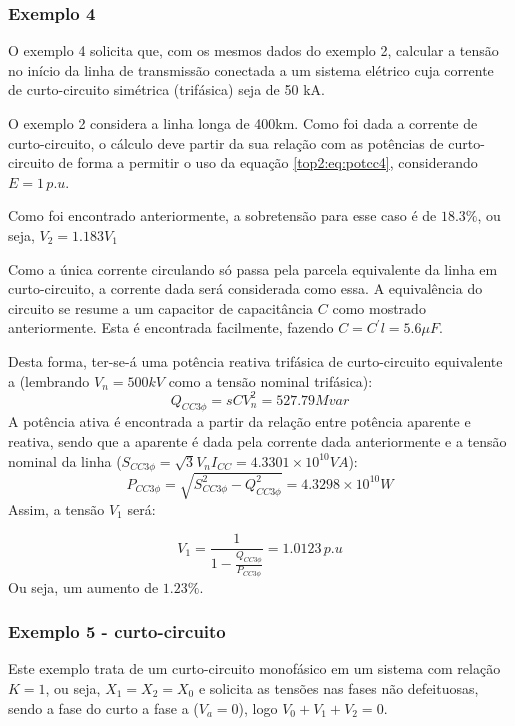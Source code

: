\subsubsection*{Exemplo 4}

O exemplo 4 solicita que, com os mesmos dados do exemplo 2, calcular a tensão no início da linha de transmissão conectada a um sistema elétrico cuja corrente de curto-circuito simétrica (trifásica) seja de 50 kA.

O exemplo 2 considera a linha longa de 400km. Como foi dada a corrente de curto-circuito, o cálculo deve partir da sua relação com as potências de curto-circuito de forma a permitir o uso da equação \ref{top2:eq:potcc4}, considerando $E = 1 \,  p.u$. 

Como foi encontrado anteriormente, a sobretensão para esse caso é de $18.3\%$, ou seja, $V_2 = 1.183 V_1$

Como a única corrente circulando só passa pela parcela equivalente da linha em curto-circuito, a corrente dada será considerada como essa. A equivalência do circuito se resume a um capacitor de capacitância $C$ como mostrado anteriormente. Esta é encontrada facilmente, fazendo $C = C^{'}l = 5.6 \mu F$. 

Desta forma, ter-se-á uma potência reativa trifásica de curto-circuito  equivalente a (lembrando $V_n = 500kV$ como a tensão nominal trifásica):
\begin{equation}
Q_{CC3\phi} = sCV_n^2 = 527.79Mvar
\end{equation}
A potência ativa é encontrada a partir da relação entre potência aparente e reativa, sendo que a aparente é dada pela corrente dada anteriormente e a tensão nominal da linha ($S_{CC3\phi} = \sqrt{3}V_nI_{CC} = 4.3301 \times 10^{10} VA$):
\begin{equation}
P_{CC3\phi} = \sqrt{S_{CC3\phi}^2 - Q_{CC3\phi}^2}  = 4.3298 \times 10^{10} W 
\end{equation}
Assim, a tensão $V_1$ será:

\begin{equation}
V_1 = \frac{1}{1-\frac{Q_{CC3\phi}}{P_{CC3\phi}}} = 1.0123 \, p.u
\end{equation}
Ou seja, um aumento de $1.23\%$.

\subsubsection*{Exemplo 5 - curto-circuito}

Este exemplo trata de um curto-circuito monofásico em um sistema com relação $K = 1$, ou seja, $X_1=X_2=X_0$ e solicita as tensões nas fases não defeituosas, sendo a fase do curto a fase a ($V_a=0$), logo $V_0+V_1+V_2=0$.

